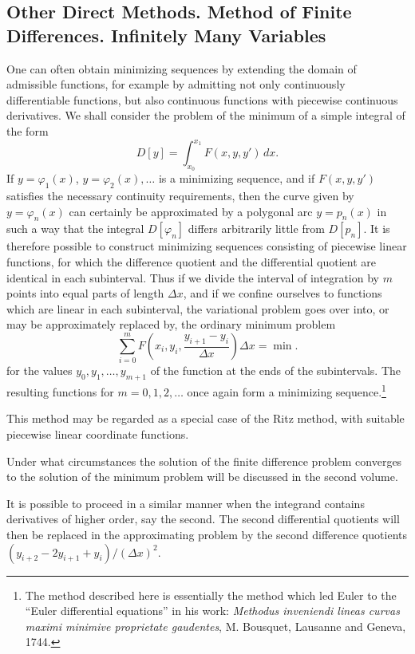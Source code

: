 \subsection{Other Direct Methods. Method of Finite Differences. Infinitely Many Variables}
One can often obtain minimizing sequences by extending the domain of admissible functions, for example by admitting not only continuously differentiable functions, but also continuous functions with piecewise continuous derivatives. We shall consider the problem of the minimum of a simple integral of the form
\[
D[y]=\int_{x_0}^{x_1}F(x,y,y')\,dx.
\]
If $y=\varphi_1(x)$, $y=\varphi_2(x),\ldots$ is a minimizing sequence, and if $F(x,y,y')$ satisfies the necessary continuity requirements, then the curve given by $y=\varphi_n(x)$ can certainly be approximated by a polygonal arc $y=p_n(x)$ in such a way that the integral $D[\varphi_n]$ differs arbitrarily little from $D[p_n]$. It is therefore possible to construct minimizing sequences consisting of piecewise linear functions, for which the difference quotient and the differential quotient are identical in each subinterval. Thus if we divide the interval of integration by $m$ points into equal parts of length $\Delta x$, and if we confine ourselves to functions which are linear in each subinterval, the variational problem goes over into, or may be approximately replaced by, the ordinary minimum problem
\[
\sum_{i=0}^{m}F\!\left(x_i,y_i,\frac{y_{i+1}-y_i}{\Delta x}\right)\Delta x=\min.
\]
for the values $y_0,y_1,\ldots,y_{m+1}$ of the function at the ends of the subintervals. The resulting functions for $m=0,1,2,\ldots$ once again form a minimizing sequence.\footnote{The method described here is essentially the method which led Euler to the ``Euler differential equations'' in his work: \emph{Methodus inveniendi lineas curvas maximi minimive proprietate gaudentes}, M. Bousquet, Lausanne and Geneva, 1744.}

This method may be regarded as a special case of the Ritz method, with suitable piecewise linear coordinate functions.

Under what circumstances the solution of the finite difference problem converges to the solution of the minimum problem will be discussed in the second volume.

It is possible to proceed in a similar manner when the integrand contains derivatives of higher order, say the second. The second differential quotients will then be replaced in the approximating problem by the second difference quotients $(y_{i+2}-2y_{i+1}+y_i)/(\Delta x)^2$.

